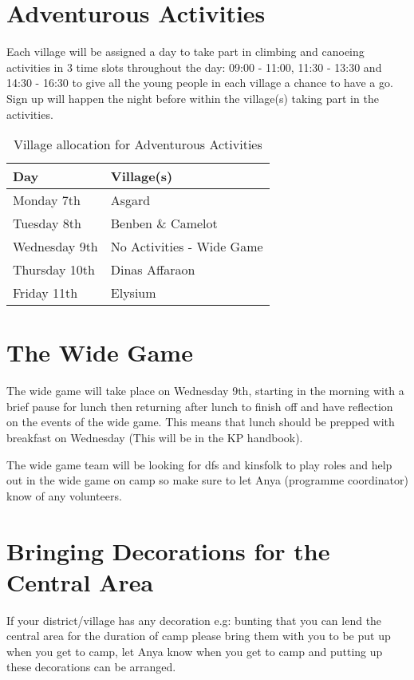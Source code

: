 \documentclass[a4paper, 11pt]{report}
\begin{document}
\section{Adventurous Activities}
Each village will be assigned a day to take part in climbing and canoeing activities in 3 time slots throughout the day: 09:00 - 11:00, 11:30 - 13:30 and 14:30 - 16:30 to give all the young people in each village a chance to have a go. Sign up will happen the night before within the village(s) taking part in the activities. 
\begin{table}[H]
    \centering
    \begin{tabular}{ll}
    \textbf{Day} & \textbf{Village(s)}\\
    \hline
    Monday 7th & Asgard \\
    \hline
    Tuesday 8th & Benben \& Camelot \\
    \hline
    Wednesday 9th & No Activities - Wide Game \\
    \hline
    Thursday 10th & Dinas Affaraon \\
    \hline
    Friday 11th & Elysium \\
    \hline
    \end{tabular}
    \caption{Village allocation for Adventurous Activities}
\end{table}

\section{The Wide Game}
The wide game will take place on Wednesday 9th, starting in the morning with a brief pause for lunch then returning after lunch to finish off and have reflection on the events of the wide game. This means that lunch should be prepped with breakfast on Wednesday (This will be in the KP handbook).\nl

The wide game team will be looking for dfs and kinsfolk to play roles and help out in the wide game on camp so make sure to let Anya (programme coordinator) know of any volunteers. 

\section{Bringing Decorations for the Central Area}
If your district/village has any decoration e.g: bunting that you can lend the central area for the duration of camp please bring them with you to be put up when you get to camp, let Anya know when you get to camp and putting up these decorations can be arranged. 
\end{document}
